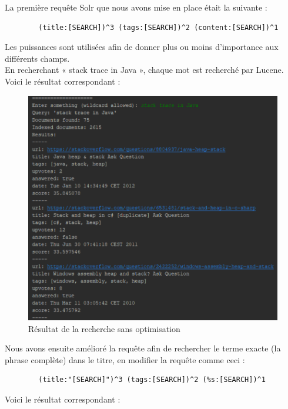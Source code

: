 \documentclass[a4paper]{article}
\begin{document}
	La première requête Solr que nous avons mise en place était la suivante :

	\begin{verbatim} 
		(title:[SEARCH])^3 (tags:[SEARCH])^2 (content:[SEARCH])^1
	\end{verbatim}

	Les puissances sont utilisées afin de donner plus ou moins d'importance aux différents champs. \\
	En recherchant « stack trace in Java », chaque mot est recherché par Lucene. Voici le résultat correspondant :

	\begin{figure}[H]
		\centering
		\includegraphics[width=\columnwidth]{images/03-search-01.png}
		\caption{Résultat de la recherche sans optimisation}
	\end{figure}

	Nous avons ensuite amélioré la requête afin de rechercher le terme exacte (la phrase complète) dans le titre,
	en modifier la requête comme ceci :

	\begin{verbatim} 
		(title:"[SEARCH]")^3 (tags:[SEARCH])^2 (%s:[SEARCH])^1
	\end{verbatim}

	Voici le résultat correspondant :
\end{document}
